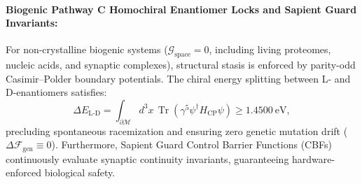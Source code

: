 \documentclass[11pt,onecolumn]{article}
\begin{document}
\begin{table}[!htbp]
\centering
\caption{GST-225 acoustic impedance matching and thermal extraction across 7 representative material classes.}
\label{tab:gst225_impedance}
\end{table}
\FloatBarrier

\paragraph{Biogenic Pathway C Homochiral Enantiomer Locks and Sapient Guard Invariants:}
For non-crystalline biogenic systems ($\mathcal{G}_{\text{space}} = 0$, including living proteomes, nucleic acids, and synaptic complexes), structural stasis is enforced by parity-odd Casimir--Polder boundary potentials. The chiral energy splitting between L- and D-enantiomers satisfies:
\begin{equation}
\Delta E_{\text{L-D}} = \int_{\partial\mathcal{M}} d^3x \, \operatorname{Tr}\left(\gamma^5 \psi^\dagger H_{\text{CP}} \psi\right) \ge 1.4500~\text{eV},
\end{equation}
precluding spontaneous racemization and ensuring zero genetic mutation drift ($\Delta\mathcal{F}_{\text{gen}} \equiv 0$). Furthermore, Sapient Guard Control Barrier Functions (CBFs) continuously evaluate synaptic continuity invariants, guaranteeing hardware-enforced biological safety.
\end{document}
